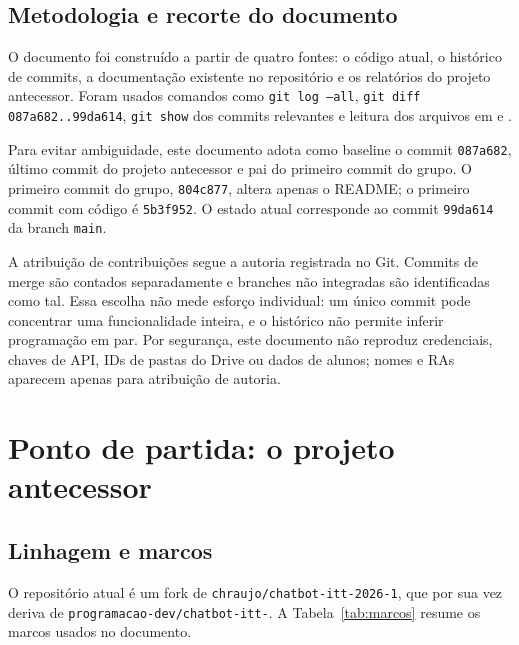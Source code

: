 \documentclass[12pt,a4paper]{article}
\newcommand{\commit}[1]{\texttt{#1}}
\newcommand{\arquivo}[1]{\path{#1}}
\begin{document}
\subsection{Metodologia e recorte do documento}

O documento foi construído a partir de quatro fontes: o código atual, o histórico
de commits, a documentação existente no repositório e os relatórios do projeto
antecessor. Foram usados comandos como \texttt{git log --all},
\texttt{git diff 087a682..99da614}, \texttt{git show} dos commits relevantes e
leitura dos arquivos em \arquivo{backend/} e \arquivo{frontend/}.

Para evitar ambiguidade, este documento adota como baseline o commit
\commit{087a682}, último commit do projeto antecessor e pai do primeiro commit do
grupo. O primeiro commit do grupo, \commit{804c877}, altera apenas o README; o
primeiro commit com código é \commit{5b3f952}. O estado atual corresponde ao commit
\commit{99da614} da branch \texttt{main}.

A atribuição de contribuições segue a autoria registrada no Git. Commits de merge
são contados separadamente e branches não integradas são identificadas como tal.
Essa escolha não mede esforço individual: um único commit pode concentrar uma
funcionalidade inteira, e o histórico não permite inferir programação em par.
Por segurança, este documento não reproduz credenciais, chaves de API, IDs de
pastas do Drive ou dados de alunos; nomes e RAs aparecem apenas para atribuição
de autoria.

\section{Ponto de partida: o projeto antecessor}

\subsection{Linhagem e marcos}

O repositório atual é um fork de \texttt{chraujo/chatbot-itt-2026-1}, que por sua
vez deriva de \texttt{programacao-dev/chatbot-itt-}. A Tabela~\ref{tab:marcos}
resume os marcos usados no documento.
\end{document}
